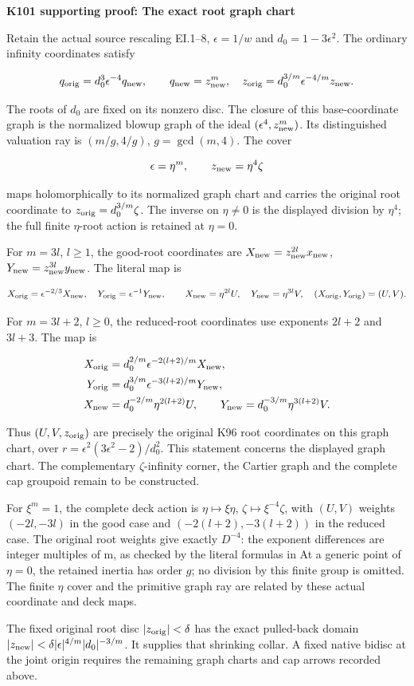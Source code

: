 \par\bigskip\noindent\textbf{K101 supporting proof: The exact root graph chart}\par\nobreak
Retain the actual source rescaling EI.1--8, \(\epsilon=1/w\) and
\(d_0=1-3\epsilon^2\). The ordinary infinity coordinates satisfy

\[
 q_{\rm orig}=d_0^3\epsilon^{-4}q_{\rm new},\qquad
 q_{\rm new}=z_{\rm new}^m,
 \quad z_{\rm orig}=d_0^{3/m}\epsilon^{-4/m}z_{\rm new}.
\]

The roots of \(d_0\) are fixed on its nonzero disc. The closure of this
base-coordinate graph is the normalized blowup graph of the ideal
\((\epsilon^4,z_{\rm new}^m)\). Its distinguished valuation ray is
\((m/g,4/g)\), \(g=\gcd(m,4)\). The cover

\[
 \epsilon=\eta^m,\qquad z_{\rm new}=\eta^4\zeta
\]

maps holomorphically to its normalized graph chart and carries the
original root coordinate to \(z_{\rm orig}=d_0^{3/m}\zeta\). The inverse on
\(\eta\ne0\) is the displayed division by \(\eta^4\); the full finite
\(\eta\)-root action is retained at \(\eta=0\).

For \(m=3l\), \(l\ge1\), the good-root coordinates are
\(X_{\rm new}=z_{\rm new}^{2l}x_{\rm new}\), \(Y_{\rm new}=z_{\rm new}^{3l}y_{\rm new}\). The literal map is

\[
 X_{\rm orig}=\epsilon^{-2/3}X_{\rm new},\quad
 Y_{\rm orig}=\epsilon^{-1}Y_{\rm new},\qquad
 X_{\rm new}=\eta^{2l}U,\quad Y_{\rm new}=\eta^{3l}V,
 \quad (X_{\rm orig},Y_{\rm orig})=(U,V).
\]

For \(m=3l+2\), \(l\ge0\), the reduced-root coordinates use exponents
\(2l+2\) and \(3l+3\). The map is

\[
 \begin{aligned}
 X_{\rm orig}&=d_0^{2/m}\epsilon^{-2(l+2)/m}X_{\rm new},\\
 Y_{\rm orig}&=d_0^{3/m}\epsilon^{-3(l+2)/m}Y_{\rm new},\\
 X_{\rm new}&=d_0^{-2/m}\eta^{2(l+2)}U,\qquad
 Y_{\rm new}=d_0^{-3/m}\eta^{3(l+2)}V.
 \end{aligned}
\]

Thus \((U,V,z_{\rm orig})\) are precisely the original K96 root coordinates
on this graph chart, over \(r=\epsilon^2(3\epsilon^2-2)/d_0^2\). This
statement concerns the displayed graph chart. The complementary
\(\zeta\)-infinity corner, the Cartier graph and the complete cap groupoid
remain to be constructed.

For \(\xi^m=1\), the complete deck action is \(\eta\mapsto\xi\eta\), \(\zeta\mapsto\xi^{-4}\zeta\), with \((U,V)\) weights \((-2l,-3l)\) in the good case and \((-2(l+2),-3(l+2))\) in the reduced case. The original root
weights give exactly \(D^{-4}\): the exponent differences are integer
multiples of m, as checked by the literal formulas in
 At a generic point
of \(\eta=0\), the retained inertia has order \(g\); no division by this
finite group is omitted. The finite \(\eta\) cover and the primitive
graph ray are related by these actual coordinate and deck maps.

The fixed original root disc \(|z_{\rm orig}|<\delta\) has the exact pulled-back
domain \(|z_{\rm new}|<\delta|\epsilon|^{4/m}|d_0|^{-3/m}\). It supplies that
shrinking collar. A fixed native bidisc at the joint origin requires
the remaining graph charts and cap arrows recorded above.

